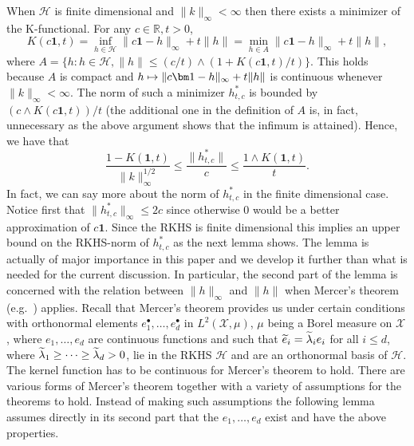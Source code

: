 \documentclass[10pt]{amsart}
\theoremstyle{definition}\newtheorem{defi}[theo]{Definition}\newtheorem{rema}[theo]{Remark}\newtheorem{exam}[theo]{Example}\newtheorem{exem}[theo]{Example}\newtheorem{nota}[theo]{Notation}
\theoremstyle{remark}
\newcommand{\R}{\mathbb{R}}
\newcommand{\X}{\mathcal{X}}
\newcommand{\cH}{\mathcal{H}}
\let\oldtilde\tilde
\renewcommand*{\tilde}[1]{\mathchoice{\widetilde{#1}}{\widetilde{#1}}{\oldtilde{#1}}{\oldtilde{#1}}}
\let\oldmapsto\mapsto
\renewcommand*{\mapsto}{\mathchoice{\longmapsto}{\oldmapsto}{\oldmapsto}{\oldmapsto}}
\begin{document}
When $\cH$ is finite dimensional and $\|k\|_\infty < \infty$ then there exists a minimizer of the K-functional. For any $c\in \R, t>0$,
\[
K(c \bm 1,t) = \inf_{h\in \cH} \| c \bm 1-h\|_\infty + t\|h\| = \min_{h \in A} \|c \bm 1-h\|_\infty + t\|h\|,
\]
where $A = \{ h : h \in \cH, \|h\| \leq (c/t) \wedge (1+ K(c \bm 1,t)/t)\}$. This holds because $A$ is compact and $h\mapsto \|c \bm 1-h\|_\infty + t \|h\|$ is continuous whenever $\|k\|_\infty < \infty$. The norm of such a minimizer $h_{t,c}^*$ is bounded by $(c \wedge K(c \bm 1,t))/t$ (the additional one in the definition of $A$ is, in fact, unnecessary as the above argument shows that the infimum is attained). Hence, we have that
\[
\frac{1 - K(\bm 1,t)}{\|k\|_\infty^{1/2}} \leq \frac{\|h^*_{t,c}\|}{c} \leq \frac{1 \wedge K(\bm 1,t)}{t}.
\]
In fact, we can say more about the norm of $h^*_{t,c}$ in the finite dimensional case. Notice first that $\|h^*_{t,c}\|_\infty \leq 2c$ since otherwise $0$ would be a better approximation of $c \bm 1$. Since the RKHS is finite dimensional this implies an upper bound on the RKHS-norm of $h^*_{t,c}$ as the next lemma shows. The lemma is actually of major importance in this paper and we develop it further than what is needed for the current discussion. In particular, the second part of the lemma is concerned with the relation between $\|h\|_\infty$ and $\|h\|$ when Mercer's theorem (e.g.~\cite[Theorem~4.49]{STEIN08}) applies. Recall that Mercer's theorem provides us under certain conditions with orthonormal elements $e_1^\bullet, \dots, e_d^\bullet$ in $L^2(\X,\mu)$, $\mu$ being a Borel measure on $\X$, where $e_1,\dots, e_d$ are continuous functions and such that $\tilde e_i = \tilde \lambda_i e_i$ for all $i\leq d$, where $\tilde \lambda_1 \geq \dots \geq \tilde \lambda_d > 0$, lie in the RKHS $\cH$ and are an orthonormal basis of $\cH$. The kernel function has to be continuous for Mercer's theorem to hold. There are various forms of Mercer's theorem together with a variety of assumptions for the theorems to hold. Instead of making such assumptions the following lemma assumes directly in its second part that the $e_1,\dots, e_d$ exist and have the above properties.
\end{document}

